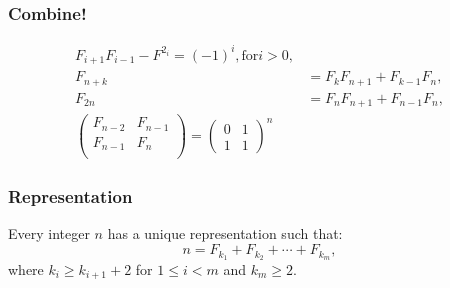 \subsubsection{Combine!}

\begin{align}
F_{i+1} F_{i-1} - F^{2_{i}} = (-1)^{i}, \text{for} i > 0,\\
F_{n+k} &= F_{k} F_{n+1} + F_{k-1} F_{n}, \\
F_{2n} &= F_{n} F_{n+1} + F_{n-1} F_{n}, \\
\begin{pmatrix}
F_{n-2} & F_{n-1} \\
F_{n-1} & F_{n} \\
\end{pmatrix}
=
\begin{pmatrix}
0 & 1 \\
1 &1 
\end{pmatrix}^{n}
\end{align}


\subsubsection{Representation}

Every integer $n$ has a unique representation such that:
\[ n = F_{k_1} + F_{k_2} + \cdots + F_{k_{m}},\]
where $k_{i} \geq k_{i+1} + 2$ for $1 \leq i < m$ and $k_{m} \geq 2$.
